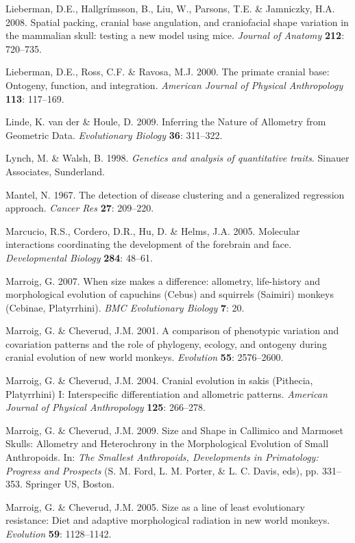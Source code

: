 \documentclass[12pt,twoside]{report}
\begin{document}
Lieberman, D.E., Hallgrímsson, B., Liu, W., Parsons, T.E. \& Jamniczky,
H.A. 2008. Spatial packing, cranial base angulation, and craniofacial
shape variation in the mammalian skull: testing a new model using mice.
\emph{Journal of Anatomy} \textbf{212}: 720--735.

Lieberman, D.E., Ross, C.F. \& Ravosa, M.J. 2000. The primate cranial
base: Ontogeny, function, and integration. \emph{American Journal of
Physical Anthropology} \textbf{113}: 117--169.

Linde, K. van der \& Houle, D. 2009. Inferring the Nature of Allometry
from Geometric Data. \emph{Evolutionary Biology} \textbf{36}: 311--322.

Lynch, M. \& Walsh, B. 1998. \emph{Genetics and analysis of quantitative
traits}. Sinauer Associates, Sunderland.

Mantel, N. 1967. The detection of disease clustering and a generalized
regression approach. \emph{Cancer Res} \textbf{27}: 209--220.

Marcucio, R.S., Cordero, D.R., Hu, D. \& Helms, J.A. 2005. Molecular
interactions coordinating the development of the forebrain and face.
\emph{Developmental Biology} \textbf{284}: 48--61.

Marroig, G. 2007. When size makes a difference: allometry, life-history
and morphological evolution of capuchins (Cebus) and squirrels (Saimiri)
monkeys (Cebinae, Platyrrhini). \emph{BMC Evolutionary Biology}
\textbf{7}: 20.

Marroig, G. \& Cheverud, J.M. 2001. A comparison of phenotypic variation
and covariation patterns and the role of phylogeny, ecology, and
ontogeny during cranial evolution of new world monkeys. \emph{Evolution}
\textbf{55}: 2576--2600.

Marroig, G. \& Cheverud, J.M. 2004. Cranial evolution in sakis
(Pithecia, Platyrrhini) I: Interspecific differentiation and allometric
patterns. \emph{American Journal of Physical Anthropology} \textbf{125}:
266--278.

Marroig, G. \& Cheverud, J.M. 2009. Size and Shape in Callimico and
Marmoset Skulls: Allometry and Heterochrony in the Morphological
Evolution of Small Anthropoids. In: \emph{The Smallest Anthropoids,
Developments in Primatology: Progress and Prospects} (S. M. Ford, L. M.
Porter, \& L. C. Davis, eds), pp. 331--353. Springer US, Boston.

Marroig, G. \& Cheverud, J.M. 2005. Size as a line of least evolutionary
resistance: Diet and adaptive morphological radiation in new world
monkeys. \emph{Evolution} \textbf{59}: 1128--1142.
\end{document}
